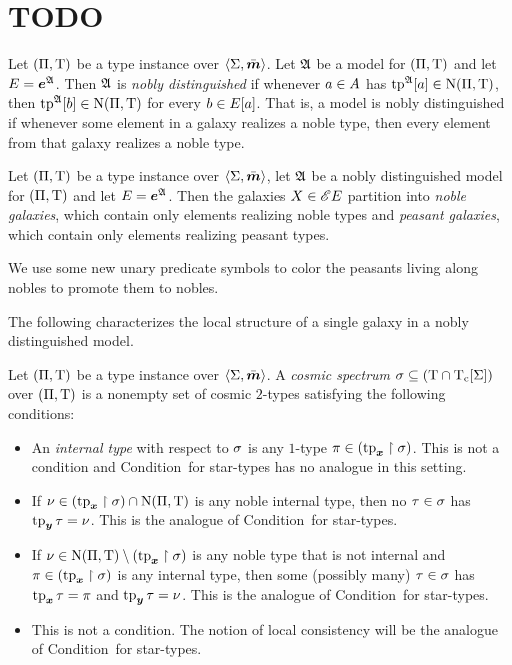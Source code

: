 \section{TODO}

\begin{definition}
Let $(\Pi,\mathrm{T})$ be a type instance over $\left\langle \mathrm{\Sigma},\bar{\bm{m}} \right\rangle$.
Let $\mathfrak{A}$ be a model for $(\Pi,\mathrm{T})$ and let $E = \bm{e}^{\mathfrak{A}}$.
Then $\mathfrak{A}$ is \emph{nobly distinguished} if whenever $a \in A$ has
$\operatorname{tp}^{\mathfrak{A}}[a] \in \mathrm{\mathrm{N}}(\Pi,\mathrm{T})$, 
then $\operatorname{tp}^{\mathfrak{A}}[b] \in \mathrm{\mathrm{N}}(\Pi,\mathrm{T})$ for every $b \in E[a]$.
That is, a model is nobly distinguished if whenever some element in a galaxy
realizes a noble type, then every element from that galaxy realizes a noble
type.
\end{definition}
\begin{remark}
Let $(\Pi,\mathrm{T})$ be a type instance over $\left\langle \mathrm{\Sigma},\bar{\bm{m}} \right\rangle$, let $\mathfrak{A}$ be a
nobly distinguished model for $(\Pi,\mathrm{T})$ and let $E = \bm{e}^{\mathfrak{A}}$.
Then the galaxies $X \in {\mathscr{E}E}$ partition into \emph{noble galaxies},
which contain only elements realizing noble types and \emph{peasant galaxies},
which contain only elements realizing peasant types.
\end{remark}

We use some new unary predicate symbols to color the peasants living along 
nobles to promote them to nobles.

The following characterizes the local structure of a single galaxy in
a nobly distinguished model.
\begin{definition}
Let $(\Pi,\mathrm{T})$ be a type instance over $\left\langle \mathrm{\Sigma},\bar{\bm{m}} \right\rangle$.
A \emph{cosmic spectrum} $\sigma \subseteq (\mathrm{T} \cap \mathrm{T}_{\mathrm{c}}[\mathrm{\Sigma}])$ over
$(\Pi,\mathrm{T})$ is a nonempty set of cosmic $2$-types satisfying the following
conditions:
\begin{itemize}
  \item[\condcspx]\label{cond:cspx}
  An \emph{internal type} with respect to $\sigma$ is any $1$-type
  $\pi \in (\operatorname{tp}_{\bm{x}}\restriction\sigma)$.
  This is not a condition and Condition~ for star-types has no
  analogue in this setting.
  \item[\condcspnx]\label{cond:cspnx}
  If $\nu \in (\operatorname{tp}_{\bm{x}}\restriction\sigma) \cap \mathrm{\mathrm{N}}(\Pi,\mathrm{T})$ is any noble
  internal type, then no $\tau \in \sigma$ has $\operatorname{tp}_{\bm{y}}\tau = \nu$.
  This is the analogue of Condition~ for star-types.
  \item[\condcspny]\label{cond:cspny}
  If $\nu \in \mathrm{\mathrm{N}}(\Pi,\mathrm{T}) \setminus (\operatorname{tp}_{\bm{x}}\restriction\sigma)$ is any noble type
  that is not internal and $\pi \in (\operatorname{tp}_{\bm{x}}\restriction\sigma)$ is any internal type, then
  some (possibly many) $\tau \in \sigma$ has $\operatorname{tp}_{\bm{x}}\tau = \pi$ and $\operatorname{tp}_{\bm{y}}\tau
  = \nu$.
  This is the analogue of Condition~ for star-types.
  \item[\condcspm]\label{cond:cspm}
  This is not a condition. The notion of local consistency
  will be the analogue of Condition~ for star-types.
\end{itemize}
\end{definition}

